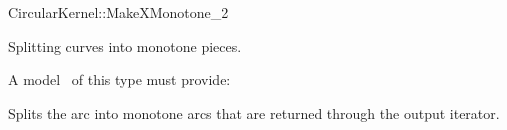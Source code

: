 \begin{ccRefFunctionObjectConcept}{CircularKernel::MakeXMonotone_2}

\ccDefinition

Splitting curves into monotone pieces. 


A model \ccVar\ of this type must provide:

{Splits the arc  into monotone arcs that are returned through the 
output iterator.}

\ccHasModels


\ccSeeAlso


\end{ccRefFunctionObjectConcept}
